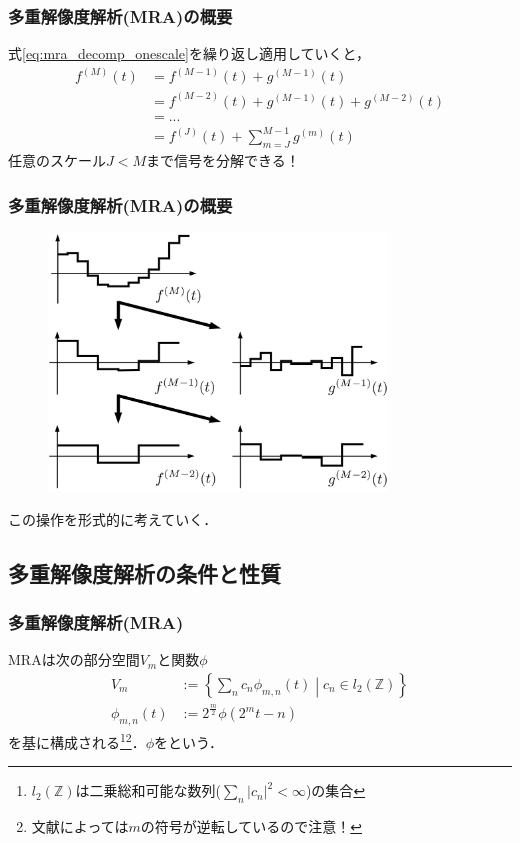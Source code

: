 \documentclass[dvipdfmx,graphicx,14pt]{beamer}
\begin{document}
\begin{frame}[c]
    \frametitle{多重解像度解析(MRA)の概要}
    式\eqref{eq:mra_decomp_onescale}を繰り返し適用していくと，
    \begin{align}
        f^{(M)}(t) &= f^{(M-1)}(t) + g^{(M-1)}(t) \nonumber \\
        &= f^{(M-2)}(t) + g^{(M-1)}(t) + g^{(M-2)}(t) \nonumber \\
        &= ... \nonumber \\
        &= f^{(J)}(t) + \sum_{m=J}^{M-1} g^{(m)}(t) \label{eq:mra_decomp_multiscale}
    \end{align}
    任意のスケール$J < M$まで信号を分解できる！
\end{frame}

\begin{frame}[c]
    \frametitle{多重解像度解析(MRA)の概要}
    \begin{figure}
        \includegraphics[width=90mm]{./figs/rma_absraction.png}
    \end{figure}
    この操作を形式的に考えていく．
\end{frame}

\subsection{多重解像度解析の条件と性質}

\begin{frame}[c]
    \frametitle{多重解像度解析(MRA)}
    MRAは次の部分空間$V_{m}$と関数$\phi$
    \begin{align}
        V_{m} &:= \left\{ \sum_{n} c_{n} \phi_{m,n}(t) \middle| c_{n} \in l_{2}(\mathbb{Z}) \right\} \\
        \phi_{m,n}(t) &:= 2^{\frac{m}{2}}\phi(2^{m}t - n)
    \end{align}
    を基に構成される\footnote{$l_{2}(\mathbb{Z})$は二乗総和可能な数列($\sum_{n} |c_{n}|^{2} < \infty$)の集合}\footnote{文献によっては$m$の符号が逆転しているので注意！}．$\phi$をという．
\end{frame}
\end{document}
